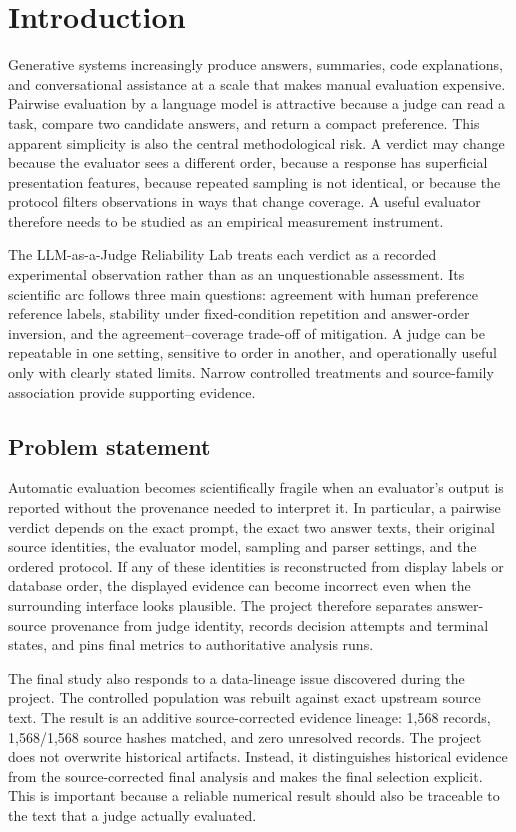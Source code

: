 \chapter{Introduction}
\label{ch:introduction}

Generative systems increasingly produce answers, summaries, code explanations, and conversational assistance at a scale that makes manual evaluation expensive. Pairwise evaluation by a language model is attractive because a judge can read a task, compare two candidate answers, and return a compact preference. This apparent simplicity is also the central methodological risk. A verdict may change because the evaluator sees a different order, because a response has superficial presentation features, because repeated sampling is not identical, or because the protocol filters observations in ways that change coverage. A useful evaluator therefore needs to be studied as an empirical measurement instrument.

The LLM-as-a-Judge Reliability Lab treats each verdict as a recorded experimental observation rather than as an unquestionable assessment. Its scientific arc follows three main questions: agreement with human preference reference labels, stability under fixed-condition repetition and answer-order inversion, and the agreement--coverage trade-off of mitigation. A judge can be repeatable in one setting, sensitive to order in another, and operationally useful only with clearly stated limits. Narrow controlled treatments and source-family association provide supporting evidence.

\section{Problem statement}

Automatic evaluation becomes scientifically fragile when an evaluator's output is reported without the provenance needed to interpret it. In particular, a pairwise verdict depends on the exact prompt, the exact two answer texts, their original source identities, the evaluator model, sampling and parser settings, and the ordered protocol. If any of these identities is reconstructed from display labels or database order, the displayed evidence can become incorrect even when the surrounding interface looks plausible. The project therefore separates answer-source provenance from judge identity, records decision attempts and terminal states, and pins final metrics to authoritative analysis runs.

The final study also responds to a data-lineage issue discovered during the project. The controlled population was rebuilt against exact upstream source text. The result is an additive source-corrected evidence lineage: 1,568 records, 1,568/1,568 source hashes matched, and zero unresolved records. The project does not overwrite historical artifacts. Instead, it distinguishes historical evidence from the source-corrected final analysis and makes the final selection explicit. This is important because a reliable numerical result should also be traceable to the text that a judge actually evaluated.

